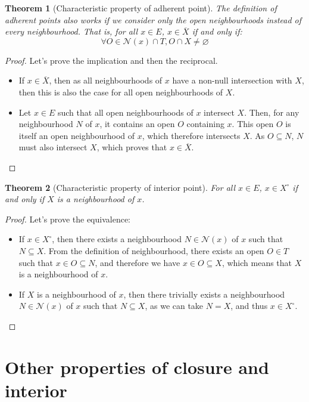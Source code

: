 \documentclass{article}
\newtheorem{theorem}{Theorem}[section]
\theoremstyle{definition}
\theoremstyle{remark}
\theoremstyle{example}
\theoremstyle{notation}
\newcommand{\inter}[1]{{{#1}^\circ}}
\newcommand{\adher}[1]{{\overline{#1}}}
\begin{document}
\begin{theorem}[Characteristic property of adherent point] \label{thm:adherent-carac}
		The definition of adherent points also works if we consider only the open neighbourhoods instead of every neighbourhood. That is, for all $x \in E$, $x \in \adher{X}$ if and only if:
				$$\forall O \in \mathcal{N}(x) \cap T, O \cap X \neq \varnothing$$
\end{theorem}

\begin{proof}
		Let's prove the implication and then the reciprocal.
		\begin{itemize}
				\item If $x \in \adher{X}$, then as all neighbourhoods of $x$ have a non-null intersection with $X$, then this is also the case for all open neighbourhoods of $X$.
				\item Let $x \in E$ such that all open neighbourhoods of $x$ intersect $X$. Then, for any neighbourhood $N$ of $x$, it contains an open $O$ containing $x$. This open $O$ is itself an open neighbourhood of $x$, which therefore intersects $X$. As $O \subseteq N$, $N$ must also intersect $X$, which proves that $x \in \adher{X}$.
		\end{itemize}
\end{proof}

\begin{theorem}[Characteristic property of interior point]
		For all $x \in E$, $x \in \inter{X}$ if and only if $X$ is a neighbourhood of $x$.
\end{theorem}

\begin{proof}
		Let's prove the equivalence:
		\begin{itemize}
				\item If $x \in \inter{X}$, then there exists a neighbourhood $N \in \mathcal{N}(x)$ of $x$ such that $N \subseteq X$. From the definition of neighbourhood, there exists an open $O \in T$ such that $x \in O \subseteq N$, and therefore we have $x \in O \subseteq X$, which means that $X$ is a neighbourhood of $x$.
				\item If $X$ is a neighbourhood of $x$, then there trivially exists a neighbourhood $N \in \mathcal{N}(x)$ of $x$ such that $N \subseteq X$, as we can take $N = X$, and thus $x \in \inter{X}$.
		\end{itemize}
\end{proof}

\section{Other properties of closure and interior}
\end{document}

